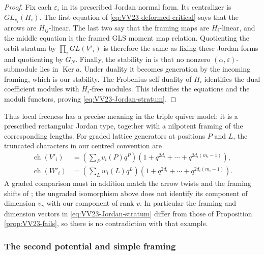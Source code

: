 \documentclass[11pt,reqno]{amsart}
\theoremstyle{definition}
\theoremstyle{remark}
\def\Ker{\operatorname{Ker}}
\begin{document}
\begin{proof}
Fix each
$\varepsilon_i$ in its prescribed Jordan normal form. Its centralizer
is $GL_{v_i}(H_i)$. The first equation of
\eqref{eq:VV23-deformed-critical} says that the arrows are
$H_{ij}$-linear. The last two say that the framing maps are
$H_i$-linear, and the middle equation is the framed GLS
moment map relation. Quotienting the orbit stratum by
$\prod_iGL(V'_i)$ is therefore the same as fixing these Jordan forms
and quotienting by $G_N$. Finally, the stability in \cite{VV23}
is that no nonzero $(\alpha,\varepsilon)$-submodule lies in
$\Ker a$. Under duality it becomes generation by the incoming
framing, which is our stability. The Frobenius self-duality of $H_i$
identifies the dual coefficient modules with $H_i$-free modules.
This identifies the equations and the moduli functors, proving
\eqref{eq:VV23-Jordan-stratum}.
\end{proof}

Thus local freeness has a precise meaning in the triple quiver model: it is a prescribed {rectangular Jordan type}, together
with a nilpotent framing of the corresponding lengths. 
\iffalse%
For graded
lattice generators at positions $P$ and $L$, the truncated characters
in our centred convention are
\begin{align*}
 \operatorname{ch}(V'_i)&=
   \left(\sum_Pv_i(P)q^P\right)
       (1+q^{2d_i}+\cdots+q^{2d_i(m_i-1)}),\\
 \operatorname{ch}(W'_i)&=
   \left(\sum_Lw_i(L)q^L\right)
       (1+q^{2d_i}+\cdots+q^{2d_i(m_i-1)}).
\end{align*}
A graded comparison must in addition match the arrow twists and the
framing shifts of \cite[(3.3)]{VV23}; the ungraded isomorphism above
does not identify its component of dimension $v_\gamma$ with our
component of rank $v$. In particular the framing and dimension vectors
in \eqref{eq:VV23-Jordan-stratum} differ from those of
Proposition \ref{prop:VV23-fails}, so there is no contradiction with
that example.


\subsubsection{The second potential and simple framing}
\end{document}
